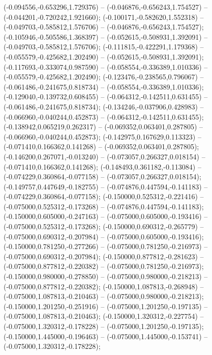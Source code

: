  (-0.094556,-0.653296,1.729376) -- (-0.046876,-0.656243,1.754527) -- (-0.044201,-0.720242,1.921660);
 (-0.100171,-0.582620,1.552318) -- (-0.049703,-0.585812,1.576706) -- (-0.046876,-0.656243,1.754527);
 (-0.105946,-0.505586,1.368397) -- (-0.052615,-0.508931,1.392091) -- (-0.049703,-0.585812,1.576706);
 (-0.111815,-0.422291,1.179368) -- (-0.055579,-0.425682,1.202490) -- (-0.052615,-0.508931,1.392091);
 (-0.117693,-0.333074,0.987590) -- (-0.058554,-0.336389,1.010336) -- (-0.055579,-0.425682,1.202490);
 (-0.123476,-0.238565,0.796067) -- (-0.061486,-0.241675,0.818734) -- (-0.058554,-0.336389,1.010336);
 (-0.129040,-0.139732,0.608455) -- (-0.064312,-0.142511,0.631455) -- (-0.061486,-0.241675,0.818734);
 (-0.134246,-0.037906,0.428983) -- (-0.066960,-0.040244,0.452873) -- (-0.064312,-0.142511,0.631455);
 (-0.138942,0.065219,0.262317) -- (-0.069352,0.063401,0.287805) -- (-0.066960,-0.040244,0.452873);
 (-0.142975,0.167629,0.113323) -- (-0.071410,0.166362,0.141268) -- (-0.069352,0.063401,0.287805);
 (-0.146200,0.267071,-0.013240) -- (-0.073057,0.266327,0.018154) -- (-0.071410,0.166362,0.141268);
 (-0.148493,0.361182,-0.113084) -- (-0.074229,0.360864,-0.077158) -- (-0.073057,0.266327,0.018154);
 (-0.149757,0.447649,-0.182755) -- (-0.074876,0.447594,-0.141183) -- (-0.074229,0.360864,-0.077158);
 (-0.150000,0.525312,-0.221416) -- (-0.075000,0.525312,-0.173268) -- (-0.074876,0.447594,-0.141183);
 (-0.150000,0.605000,-0.247163) -- (-0.075000,0.605000,-0.193416) -- (-0.075000,0.525312,-0.173268);
 (-0.150000,0.690312,-0.265779) -- (-0.075000,0.690312,-0.207984) -- (-0.075000,0.605000,-0.193416);
 (-0.150000,0.781250,-0.277266) -- (-0.075000,0.781250,-0.216973) -- (-0.075000,0.690312,-0.207984);
 (-0.150000,0.877812,-0.281623) -- (-0.075000,0.877812,-0.220382) -- (-0.075000,0.781250,-0.216973);
 (-0.150000,0.980000,-0.278850) -- (-0.075000,0.980000,-0.218213) -- (-0.075000,0.877812,-0.220382);
 (-0.150000,1.087813,-0.268948) -- (-0.075000,1.087813,-0.210463) -- (-0.075000,0.980000,-0.218213);
 (-0.150000,1.201250,-0.251916) -- (-0.075000,1.201250,-0.197135) -- (-0.075000,1.087813,-0.210463);
 (-0.150000,1.320312,-0.227754) -- (-0.075000,1.320312,-0.178228) -- (-0.075000,1.201250,-0.197135);
 (-0.150000,1.445000,-0.196463) -- (-0.075000,1.445000,-0.153741) -- (-0.075000,1.320312,-0.178228);
